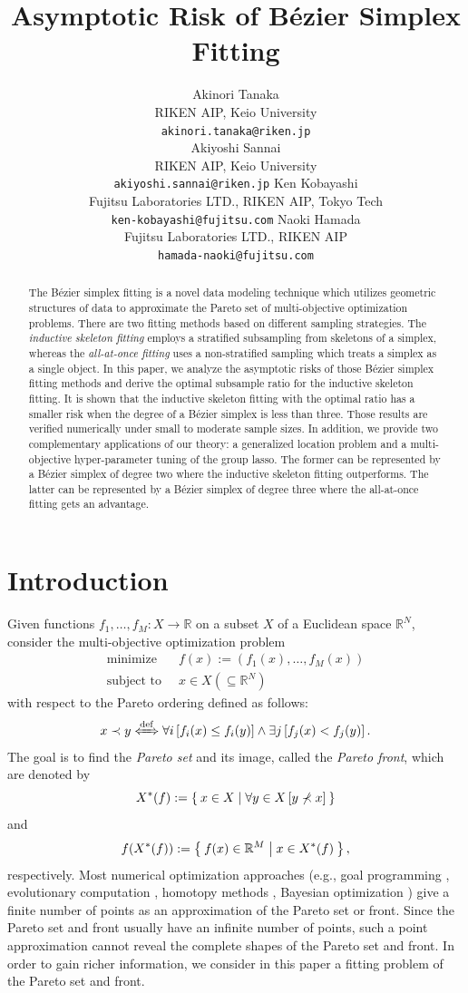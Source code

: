 \documentclass[letterpaper]{article} %
\author{%
  Akinori Tanaka%
    \\
  RIKEN AIP, Keio University
  \\
  \texttt{akinori.tanaka@riken.jp} 
  \\
  \And
  Akiyoshi Sannai 
  \\
  RIKEN AIP, Keio University
  \\
  \texttt{akiyoshi.sannai@riken.jp} 
  \AND
  Ken Kobayashi 
  \\
  Fujitsu Laboratories LTD., RIKEN AIP, Tokyo Tech
  \\
  \texttt{ken-kobayashi@fujitsu.com} 
  \And
  Naoki Hamada 
  \\
  Fujitsu Laboratories LTD., RIKEN AIP
  \\
  \texttt{hamada-naoki@fujitsu.com} 
}
\title{Asymptotic Risk of B\'ezier Simplex Fitting}
\theoremstyle{plain}
\newcommand{\sqbra}[1]{\left[#1 \right]}
\newcommand{\R}{\mathbb{R}}
\begin{document}
\maketitle

\begin{abstract}
The B\'ezier simplex fitting is a novel data modeling technique which utilizes geometric structures of data to approximate the Pareto set of multi-objective optimization problems.
There are two fitting methods based on different sampling strategies.
The \emph{inductive skeleton fitting} employs a stratified subsampling from skeletons of a simplex, whereas the \emph{all-at-once fitting} uses a non-stratified sampling which treats a simplex as a single object.
In this paper, we analyze the asymptotic risks of those B\'ezier simplex fitting methods and derive the optimal subsample ratio for the inductive skeleton fitting.
It is shown that the inductive skeleton fitting with the optimal ratio has a smaller risk when the degree of a B\'ezier simplex is less than three.
Those results are verified numerically under small to moderate sample sizes.
In addition, we provide two complementary applications of our theory: a generalized location problem and a multi-objective hyper-parameter tuning of the group lasso.
The former can be represented by a B\'ezier simplex of degree two where the inductive skeleton fitting outperforms.
The latter can be represented by a B\'ezier simplex of degree three where the all-at-once fitting gets an advantage.
\end{abstract}


\section{Introduction}
Given functions $f_1, \dots, f_M: X \to \R$ on a subset $X$ of a Euclidean space $\R^N$, consider the multi-objective optimization problem
\begin{align*}
    \text{minimize } &~f(x) := (f_1(x), \dots, f_M(x)) \\
    \text{subject to } &~x \in X (\subseteq \R^N)
\end{align*}
with respect to the Pareto ordering defined as follows:
\[
x \prec y \xLeftrightarrow{\mathrm{def}} \forall i \sqbra{f_i(x) \leq f_i(y)} \land \exists j \sqbra{f_j(x) < f_j(y)}.
\]
The goal is to find the \emph{Pareto set} and its image, called the \emph{Pareto front}, which are denoted by
\[
    X^*(f) := \Set{x \in X | \forall y \in X \sqbra{y \not\prec x}}
\]
and
\[
    f(X^*(f)) := \Set{f(x) \in \R^M | x \in X^*(f)},
\]
respectively.
Most numerical optimization approaches (e.g., goal programming \cite{Miettinen1999,Eichfelder2008}, evolutionary computation \cite{Deb2001,Zhang2007,Deb2014}, homotopy methods \cite{Hillermeier2001,Harada2007}, Bayesian optimization \cite{Hernandez-Lobato2016,Yang2019}) give a finite number of points as an approximation of the Pareto set or front.
Since the Pareto set and front usually have an infinite number of points, such a point approximation cannot reveal the complete shapes of the Pareto set and front.
In order to gain richer information, we consider in this paper a fitting problem of the Pareto set and front.
\end{document}
